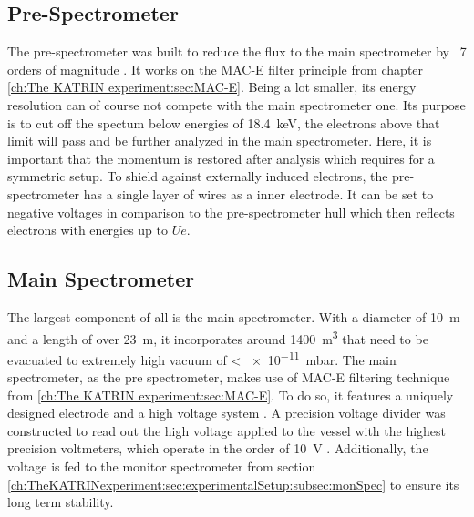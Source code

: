      \subsection{Pre-Spectrometer}
      \label{ch:The KATRIN experiment:sec:Experimental setup:subsec:PreSpectrometer}
      The pre-spectrometer was built to reduce the flux to the main spectrometer by ~7 orders of magnitude \cite{statusPSWolf}. It works on the MAC-E filter principle from chapter \ref{ch:The KATRIN experiment:sec:MAC-E}. Being a lot smaller, its energy resolution can of course not compete with the main spectrometer one. Its purpose is to cut off the spectum below energies of \SI{18.4}{\kilo\electronvolt}, the electrons above that limit will pass and be further analyzed in the main spectrometer. Here, it is important that the momentum is restored after analysis which requires for a symmetric setup. To shield against externally induced electrons, the pre-spectrometer has a single layer of wires as a inner electrode. It can be set to negative voltages in comparison to the pre-spectrometer hull which then reflects electrons with energies up to $Ue$.
      
      \subsection{Main Spectrometer}
      \label{ch:The KATRIN experiment:sec:Experimental setup:subsec:MainSpec}
      The largest component of all is the main spectrometer. With a diameter of \SI{10}{\meter} and a length of over \SI{23}{\meter}, it incorporates around \SI{1400}{\cubic\meter} that need to be evacuated to extremely high vacuum of < \SI{e-11}{\milli\bar}. The main spectrometer, as the pre spectrometer, makes use of MAC-E filtering technique from \ref{ch:The KATRIN experiment:sec:MAC-E}. To do so, it features a uniquely designed electrode and a high voltage system \cite{mainSpecElectrodeDesign}. A precision voltage divider was constructed to read out the high voltage applied to the vessel with the highest precision voltmeters, which operate in the order of \SI{10}{\volt} \cite{highVoltageDivider}. Additionally, the voltage is fed to the monitor spectrometer from section \ref{ch:TheKATRINexperiment:sec:experimentalSetup:subsec:monSpec} to ensure its long term stability.
      
